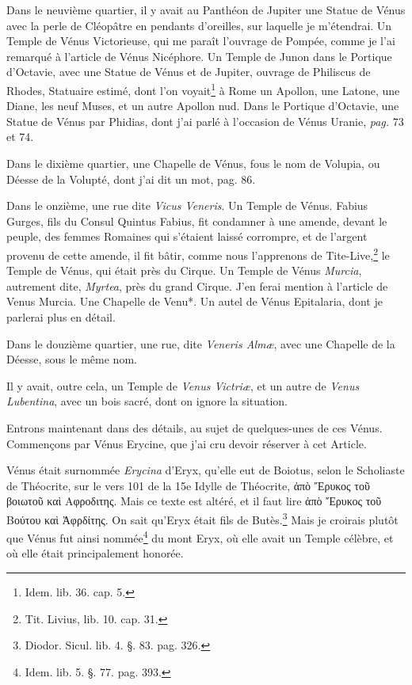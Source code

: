 \documentclass[a4paper, 18pt, oneside]{article}
\begin{document}
Dans le neuvième quartier, il y avait au Panthéon de Jupiter une Statue de Vénus avec la perle de Cléopâtre en pendants d'oreilles, sur laquelle je m'étendrai. Un Temple de Vénus Victorieuse, qui me paraît l'ouvrage de Pompée, comme je l'ai remarqué à l'article de Vénus Nicéphore. Un Temple de Junon dans le Portique d'Octavie, avec une Statue de Vénus et de Jupiter, ouvrage de Philiscus de Rhodes, Statuaire estimé, dont l'on voyait\footnote{Idem. lib. 36. cap. 5.} à Rome un Apollon, une Latone, une Diane, les neuf Muses, et un autre Apollon nud. Dans le Portique d'Octavie, une Statue de Vénus par Phidias, dont j'ai parlé à l'occasion de Vénus Uranie, \emph{pag.} 73 et 74.

Dans le dixième quartier, une Chapelle de Vénus, fous le nom de Volupia, ou Déesse de la Volupté, dont j'ai dit un mot, pag. 86.

Dans le onzième, une rue dite \emph{Vicus Veneris}. Un Temple de Vénus. Fabius Gurges, fils du Consul Quintus Fabius, fit condamner à une amende, devant le peuple, des femmes Romaines qui s'étaient laissé corrompre, et de l'argent provenu de cette amende, il fit bâtir, comme nous l'apprenons de Tite-Live,\footnote{Tit. Livius, lib. 10. cap. 31.} le Temple de Vénus, qui était près du Cirque. Un Temple de Vénus \emph{Murcia}, autrement dite, \emph{Myrtea}, près du grand Cirque. J'en ferai mention à l'article de Venus Murcia. Une Chapelle de Venu*. Un autel de Vénus Epitalaria, dont je parlerai plus en détail.

Dans le douzième quartier, une rue, dite \emph{Veneris Almæ}, avec une Chapelle de la Déesse, sous le même nom.

Il y avait, outre cela, un Temple de \emph{Venus Victriæ}, et un autre de \emph{Venus Lubentina}, avec un bois sacré, dont on ignore la situation.

Entrons maintenant dans des détails, au sujet de quelques-unes de ces Vénus. Commençons par Vénus Erycine, que j'ai cru devoir réserver à cet Article.

Vénus était surnommée \emph{Erycina} d'Eryx, qu'elle eut de Boiotus, selon le Scholiaste de Théocrite, sur le vers 101 de la 15e Idylle de Théocrite, ἀπὸ Ἔρυκος τοῦ βοιωτοῦ καὶ Αφροδιτης. Mais ce texte est altéré, et il faut lire ἀπὸ Ἔρυκος τοῦ Βούτου καὶ Ἀφρδίτης. On sait qu'Eryx était fils de Butès.\footnote{Diodor. Sicul. lib. 4. §. 83. pag. 326.} Mais je croirais plutôt que Vénus fut ainsi nommée\footnote{Idem. lib. 5. §. 77. pag. 393.} du mont Eryx, où elle avait un Temple célèbre, et où elle était principalement honorée.
\end{document}
